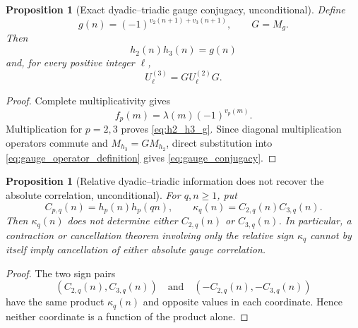 \documentclass[11pt]{amsart}
\numberwithin{equation}{section}
\theoremstyle{plain}
\newtheorem{proposition}[theorem]{Proposition}
\theoremstyle{definition}
\theoremstyle{remark}
\newcommand{\liou}{\lambda}
\begin{document}
\begin{proposition}[Exact dyadic--triadic gauge conjugacy, unconditional]
\label{prop:dyadic_triadic_conjugacy}
Define
\begin{equation}
g(n)=(-1)^{v_2(n+1)+v_3(n+1)},
\qquad G=M_g.
\label{eq:gauge_g_definition}
\end{equation}
Then
\begin{equation}
h_2(n)h_3(n)=g(n)
\label{eq:h2_h3_g}
\end{equation}
and, for every positive integer $\ell$,
\begin{equation}
U_\ell^{(3)}=G U_\ell^{(2)}G.
\label{eq:gauge_conjugacy}
\end{equation}
\end{proposition}

\begin{proof}
Complete multiplicativity gives
\begin{equation}
f_p(m)=\liou(m)(-1)^{v_p(m)}.
\label{eq:fp_complete_multiplicativity}
\end{equation}
Multiplication for $p=2,3$ proves \eqref{eq:h2_h3_g}.  Since diagonal multiplication operators commute and $M_{h_3}=GM_{h_2}$, direct substitution into \eqref{eq:gauge_operator_definition} gives \eqref{eq:gauge_conjugacy}.
\end{proof}

\begin{proposition}[Relative dyadic--triadic information does not recover the absolute correlation, unconditional]
\label{prop:relative_not_absolute}
For $q,n\ge1$, put
\begin{equation}
C_{p,q}(n)=h_p(n)h_p(qn),
\qquad
\kappa_q(n)=C_{2,q}(n)C_{3,q}(n).
\label{eq:gauge_correlations}
\end{equation}
Then $\kappa_q(n)$ does not determine either $C_{2,q}(n)$ or $C_{3,q}(n)$.  In particular, a contraction or cancellation theorem involving only the relative sign $\kappa_q$ cannot by itself imply cancellation of either absolute gauge correlation.
\end{proposition}

\begin{proof}
The two sign pairs
\begin{equation}
(C_{2,q}(n),C_{3,q}(n))
\quad\text{and}\quad
(-C_{2,q}(n),-C_{3,q}(n))
\label{eq:relative_sign_ambiguity}
\end{equation}
have the same product $\kappa_q(n)$ and opposite values in each coordinate.  Hence neither coordinate is a function of the product alone.
\end{proof}
\end{document}

